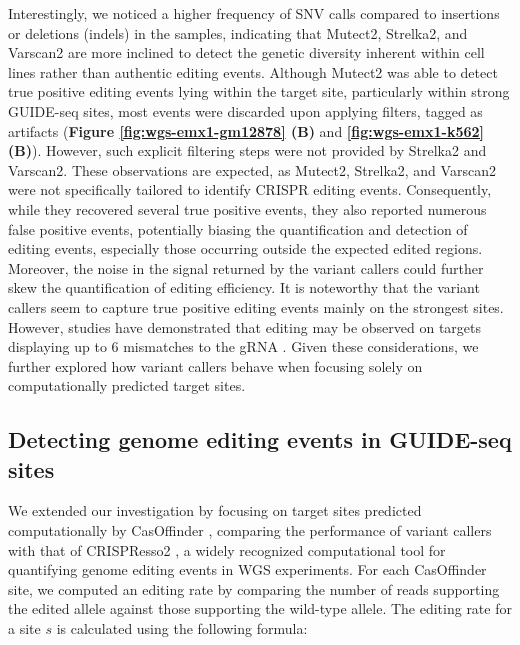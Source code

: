 \documentclass[a4paper, titlepage, openright]{book}
\begin{document}
Interestingly, we noticed a higher frequency of SNV calls compared to insertions or deletions (indels) in the samples, indicating that Mutect2, Strelka2, and Varscan2 are more inclined to detect the genetic diversity inherent within cell lines rather than authentic editing events. Although Mutect2 was able to detect true positive editing events lying within the target site, particularly within strong GUIDE-seq sites, most events were discarded upon applying filters, tagged as artifacts (\textbf{Figure \ref{fig:wgs-emx1-gm12878} (B)} and \textbf{\ref{fig:wgs-emx1-k562} (B)}). However, such explicit filtering steps were not provided by Strelka2 and Varscan2. These observations are expected, as Mutect2, Strelka2, and Varscan2 were not specifically tailored to identify CRISPR editing events. Consequently, while they recovered several true positive events, they also reported numerous false positive events, potentially biasing the quantification and detection of editing events, especially those occurring outside the expected edited regions. Moreover, the noise in the signal returned by the variant callers could further skew the quantification of editing efficiency. It is noteworthy that the variant callers seem to capture true positive editing events mainly on the strongest sites. However, studies have demonstrated that editing may be observed on targets displaying up to 6 mismatches to the gRNA \citep{tsai2015guide,clement2020technologies}. Given these considerations, we further explored how variant callers behave when focusing solely on computationally predicted target sites.

\subsection{Detecting genome editing events in GUIDE-seq sites}
We extended our investigation by focusing on target sites predicted computationally by CasOffinder \citep{bae2014cas}, comparing the performance of variant callers with that of CRISPResso2 \citep{clement2019crispresso2}, a widely recognized computational tool for quantifying genome editing events in WGS experiments. For each CasOffinder site, we computed an editing rate by comparing the number of reads supporting the edited allele against those supporting the wild-type allele. The editing rate for a site $s$ is calculated using the following formula:
\end{document}
